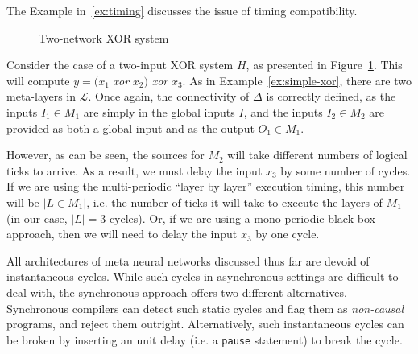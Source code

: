 
The Example in~\ref{ex:timing} discusses the issue of timing compatibility.

\begin{figure}[H]
	\centering
	\scalebox{0.8}{}
	\caption{Two-network XOR system}
	\label{fig:two-xor}
\end{figure}

\begin{example}
	\label{ex:timing}
	Consider the case of a two-input XOR system $H$, as presented in Figure~\ref{fig:two-xor}.
	This will compute $y = \big(x_1$ \textit{xor} $x_2\big)$ \textit{xor} $x_3$.
	As in Example~\ref{ex:simple-xor}, there are two meta-layers in $\mathcal{L}$. 
	Once again, the connectivity of $\Delta$ is correctly defined, as the inputs $I_1 \in M_1$ are simply in the global inputs $I$, and the inputs $I_2 \in M_2$ are provided as both a global input and as the output $O_1 \in M_1$.  
	
	However, as can be seen, the sources for $M_2$ will take different numbers of logical ticks to arrive.
	As a result, we must delay the input $x_3$ by some number of cycles.
	If we are using the multi-periodic ``layer by layer'' execution timing, this number will be $|L \in M_1|$, i.e. the number of ticks it will take to execute the layers of $M_1$ (in our case, $|L| = 3$ cycles). 
	Or, if we are using a mono-periodic black-box approach, then we will need to delay the input $x_3$ by one cycle.
\end{example}

All architectures of meta neural networks discussed thus far are
devoid of instantaneous cycles. While such cycles in asynchronous settings are difficult
to deal with, the synchronous approach offers two different
alternatives. Synchronous compilers can detect such static cycles and flag
them as \emph{non-causal}~\cite{benveniste2003synchronous} programs, and reject them outright. Alternatively, such instantaneous cycles
can be broken by inserting an unit delay (i.e. a \texttt{pause}
statement) to break the cycle.

